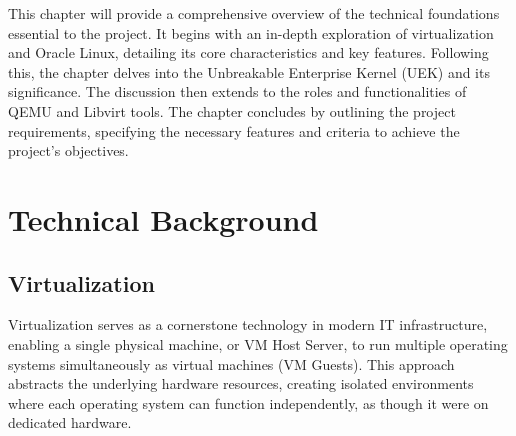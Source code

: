 This chapter will provide a comprehensive overview of the technical foundations essential to the project. It begins with an in-depth exploration of virtualization and Oracle Linux, detailing its core characteristics and key features. Following this, the chapter delves into the Unbreakable Enterprise Kernel (UEK) and its significance. The discussion then extends to the roles and functionalities of QEMU and Libvirt tools. The chapter concludes by outlining the project requirements, specifying the necessary features and criteria to achieve the project’s objectives.

\newpage
{}
\hypertarget{secondchapter}{}
\section{Technical Background}

\subsection{Virtualization}
Virtualization serves as a cornerstone technology in modern IT infrastructure, enabling a single physical machine, or VM Host Server, to run multiple operating systems simultaneously as virtual machines (VM Guests). This approach abstracts the underlying hardware resources, creating isolated environments where each operating system can function independently, as though it were on dedicated hardware.

